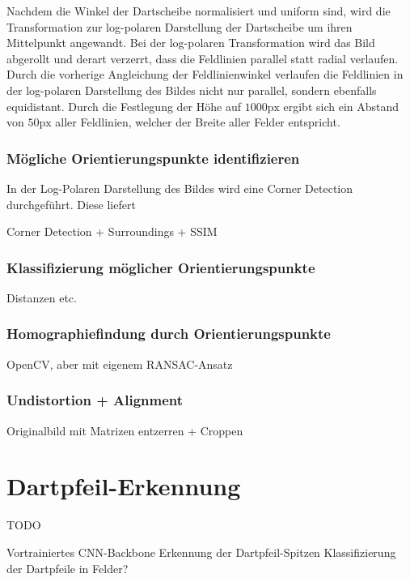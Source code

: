 Nachdem die Winkel der Dartscheibe normalisiert und uniform sind, wird die Transformation zur log-polaren Darstellung der Dartscheibe um ihren Mittelpunkt angewandt. Bei der log-polaren Transformation wird das Bild abgerollt und derart verzerrt, dass die Feldlinien parallel statt radial verlaufen. Durch die vorherige Angleichung der Feldlinienwinkel verlaufen die Feldlinien in der log-polaren Darstellung des Bildes nicht nur parallel, sondern ebenfalls equidistant. Durch die Festlegung der Höhe auf $1000\text{px}$ ergibt sich ein Abstand von $50\text{px}$ aller Feldlinien, welcher der Breite aller Felder entspricht.

\subsubsection{Mögliche Orientierungspunkte identifizieren}
\label{sec:impl:cv:orient:points}

In der Log-Polaren Darstellung des Bildes wird eine Corner Detection durchgeführt. Diese liefert 

Corner Detection + Surroundings + SSIM

\subsubsection{Klassifizierung möglicher Orientierungspunkte}
\label{sec:impl:cv:orient:sorting}
Distanzen etc.

\subsubsection{Homographiefindung durch Orientierungspunkte}
\label{sec:impl:cv:orient:homography}
OpenCV, aber mit eigenem RANSAC-Ansatz

\subsubsection{Undistortion + Alignment}
\label{sec:impl:cv:orient:undistort}
Originalbild mit Matrizen entzerren + Croppen


\section{Dartpfeil-Erkennung}
\label{sec:impl:ki}

TODO

Vortrainiertes CNN-Backbone
Erkennung der Dartpfeil-Spitzen
Klassifizierung der Dartpfeile in Felder?
